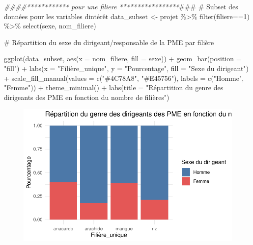 \documentclass[
  letterpaper,
  DIV=11,
  numbers=noendperiod]{scrartcl}
\newenvironment{Shaded}{\begin{snugshade}}{\end{snugshade}}
\newcommand{\AlertTok}[1]{\textcolor[rgb]{0.68,0.00,0.00}{#1}}
\newcommand{\AttributeTok}[1]{\textcolor[rgb]{0.40,0.45,0.13}{#1}}
\newcommand{\CommentTok}[1]{\textcolor[rgb]{0.37,0.37,0.37}{#1}}
\newcommand{\DecValTok}[1]{\textcolor[rgb]{0.68,0.00,0.00}{#1}}
\newcommand{\DocumentationTok}[1]{\textcolor[rgb]{0.37,0.37,0.37}{\textit{#1}}}
\newcommand{\FunctionTok}[1]{\textcolor[rgb]{0.28,0.35,0.67}{#1}}
\newcommand{\NormalTok}[1]{\textcolor[rgb]{0.00,0.23,0.31}{#1}}
\newcommand{\OtherTok}[1]{\textcolor[rgb]{0.00,0.23,0.31}{#1}}
\newcommand{\SpecialCharTok}[1]{\textcolor[rgb]{0.37,0.37,0.37}{#1}}
\newcommand{\StringTok}[1]{\textcolor[rgb]{0.13,0.47,0.30}{#1}}
\begin{document}
\begin{Shaded}
\begin{Highlighting}[]
\DocumentationTok{\#\#\#\#************ pour une filiere *****************}\AlertTok{\#\#\#}
\CommentTok{\# Subset des données pour les variables d\textquotesingle{}intérêt}
\NormalTok{data\_subset }\OtherTok{\textless{}{-}}\NormalTok{ projet }\SpecialCharTok{\%\textgreater{}\%} \FunctionTok{filter}\NormalTok{(filiere}\SpecialCharTok{==}\DecValTok{1}\NormalTok{) }\SpecialCharTok{\%\textgreater{}\%} \FunctionTok{select}\NormalTok{(sexe, nom\_filiere)}


\CommentTok{\# Répartition du sexe du dirigeant/responsable de la PME par filière}

\FunctionTok{ggplot}\NormalTok{(data\_subset, }\FunctionTok{aes}\NormalTok{(}\AttributeTok{x =}\NormalTok{ nom\_filiere, }\AttributeTok{fill =}\NormalTok{ sexe)) }\SpecialCharTok{+}
  \FunctionTok{geom\_bar}\NormalTok{(}\AttributeTok{position =} \StringTok{"fill"}\NormalTok{) }\SpecialCharTok{+}
  \FunctionTok{labs}\NormalTok{(}\AttributeTok{x =} \StringTok{"Filière\_unique"}\NormalTok{, }\AttributeTok{y =} \StringTok{"Pourcentage"}\NormalTok{, }\AttributeTok{fill =} \StringTok{"Sexe du dirigeant"}\NormalTok{) }\SpecialCharTok{+}
  \FunctionTok{scale\_fill\_manual}\NormalTok{(}\AttributeTok{values =} \FunctionTok{c}\NormalTok{(}\StringTok{"\#4C78A8"}\NormalTok{, }\StringTok{"\#E45756"}\NormalTok{), }\AttributeTok{labels =} \FunctionTok{c}\NormalTok{(}\StringTok{"Homme"}\NormalTok{, }\StringTok{"Femme"}\NormalTok{)) }\SpecialCharTok{+}
  \FunctionTok{theme\_minimal}\NormalTok{() }\SpecialCharTok{+}
  \FunctionTok{labs}\NormalTok{(}\AttributeTok{title =} \StringTok{"Répartition du genre des dirigeants des PME en fonction du nombre de filières"}\NormalTok{)}
\end{Highlighting}
\end{Shaded}

\begin{figure}[H]

{\centering \includegraphics{projet_R_files/figure-pdf/unnamed-chunk-32-1.pdf}

}

\end{figure}
\end{document}
